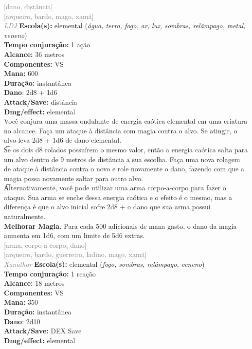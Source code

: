 \documentclass{RPG_Adventure}[2021/10/20]
\begin{document}
{\scriptsize \textcolor{gray}{[dano, distância]\\}}
{\scriptsize \textcolor{gray}{[arqueiro, bardo, mago, xamã]\\}}
{\tiny \textcolor{gray}{\textit{LDJ}}}\jump{}
{\small \t \textbf{Escola(s):} elemental (\textit{água, terra, fogo, ar, luz, sombras, relâmpago, metal, veneno})\\\t \textbf{Tempo conjuração:} 1 ação\\\t \textbf{Alcance:} 36 metros\\\t \textbf{Componentes:} VS\\\t \textbf{Mana:} 600\\\t \textbf{Duração:} instantânea\\\t \textbf{Dano}: 2d8 + 1d6\\\t \textbf{Attack/Save:} distância\\\t \textbf{Dmg/effect:} elemental\\}
{\normalsize Você conjura uma massa ondulante de energia caótica elemental em uma criatura no alcance. Faça um ataque à distância com magia contra o alvo. Se atingir, o alvo leva 2d8 + 1d6 de dano elemental.\\\t Se os dois d8 rolados possuírem o mesmo valor, então a energia caótica salta para um alvo dentro de 9 metros de distância a sua escolha. Faça uma nova rolagem de ataque à distância contra o novo e role novamente o dano, fazendo com que a magia possa novamente saltar para outro alvo.\\\t Alternativamente, você pode utilizar uma arma corpo-a-corpo para fazer o ataque. Sua arma se enche dessa energia caótica e o efeito é o mesmo, mas a diferença é que o alvo inicial sofre 2d8 + o dano que sua arma possui naturalmente.\\\t \textbf{Melhorar Magia.} Para cada 500 adicionais de mana gasto, o dano da magia aumenta em 1d6, com um limite de 5d6 extras.\\}
{\scriptsize \textcolor{gray}{[arma, corpo-a-corpo, dano]\\}}
{\scriptsize \textcolor{gray}{[arqueiro, bardo, guerreiro, ladino, mago, xamã]\\}}
{\tiny \textcolor{gray}{\textit{Xanathar}}}\jump{}
{\small \t \textbf{Escola(s):} elemental (\textit{fogo, sombras, relâmpago, veneno})\\\t \textbf{Tempo conjuração:} 1 reação\\\t \textbf{Alcance:} 18 metros\\\t \textbf{Componentes:} VS\\\t \textbf{Mana:} 350\\\t \textbf{Duração:} instantânea\\\t \textbf{Dano}: 2d10\\\t \textbf{Attack/Save:} DEX Save\\\t \textbf{Dmg/effect:} elemental\\}
\end{document}
